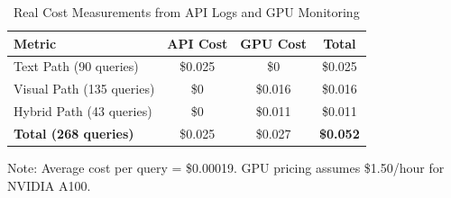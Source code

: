 \begin{table}[t]
\centering
\caption{Real Cost Measurements from API Logs and GPU Monitoring}
\label{tab:real_costs}
\begin{tabular}{lccc}
\toprule
\textbf{Metric} & \textbf{API Cost} & \textbf{GPU Cost} & \textbf{Total} \\
\midrule
Text Path (90 queries) & \$0.025 & \$0 & \$0.025 \\
Visual Path (135 queries) & \$0 & \$0.016 & \$0.016 \\
Hybrid Path (43 queries) & \$0 & \$0.011 & \$0.011 \\
\midrule
\textbf{Total (268 queries)} & \$0.025 & \$0.027 & \textbf{\$0.052} \\
\bottomrule
\end{tabular}
\par\medskip
\footnotesize Note: Average cost per query = \$0.00019. GPU pricing assumes \$1.50/hour for NVIDIA A100.
\end{table}
